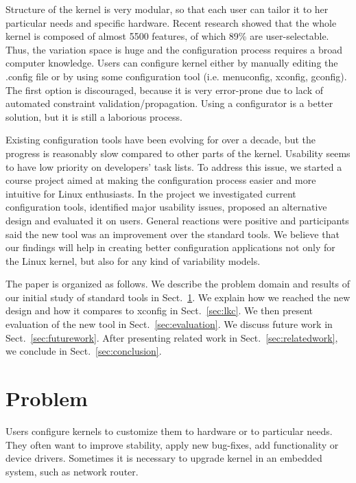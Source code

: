 \documentclass{chi2009}
\newcommand{\secref}[1]{Sect.~\ref{sec:#1}}
\begin{document}
Structure of the kernel is very modular, so that each user can tailor it to her particular needs and specific hardware. Recent research \cite{she:kernel:2010} showed that the whole kernel is composed of almost 5500 features, of which 89\% are user-selectable. Thus, the variation space is huge and the configuration process requires a broad computer knowledge. Users can configure kernel either by manually editing the \textsf{.config} file or by using some configuration tool (i.e. \textsf{menuconfig, xconfig, gconfig}). The first option is discouraged, because it is very error-prone due to lack of automated constraint validation/propagation. Using a configurator is a better solution, but it is still a laborious process.

Existing configuration tools have been evolving for over a decade, but the progress is reasonably slow compared to other parts of the kernel. Usability seems to have low priority on developers' task lists. To address this issue, we started a course project aimed at making the configuration process easier and more intuitive for Linux enthusiasts. In the project we investigated current configuration tools, identified major usability issues, proposed an alternative design and evaluated it on users. General reactions were positive and participants said the new tool was an improvement over the standard tools. We believe that our findings will help in creating better configuration applications not only for the Linux kernel, but also for any kind of variability models.

The paper is organized as follows. We describe the problem domain and results of our initial study of standard tools in \secref{problem}. We explain how we reached the new design and how it compares to \textsf{xconfig} in \secref{lkc}. We then present evaluation of the new tool in \secref{evaluation}. We discuss future work in \secref{futurework}. After presenting related work in \secref{relatedwork}, we conclude in \secref{conclusion}.

\section{Problem}\label{sec:problem}

Users configure kernels to customize them to hardware or to particular needs. They often want to improve stability, apply new bug-fixes, add functionality or device drivers. Sometimes it is necessary to upgrade kernel in an embedded system, such as network router.
\end{document}
